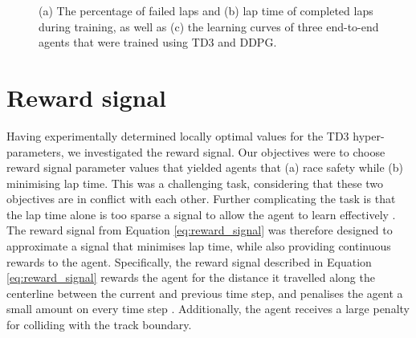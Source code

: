 \begin{figure}[htb!]
    \centering
    
    \caption[Learning curves showing for agents trained using TD3 and DDPG]{(a) The percentage of failed laps and (b) lap time of completed laps during training, as well as (c) the learning curves of three end-to-end agents that were trained using TD3 and DDPG.}
    \label{fig:learning_method}
\end{figure}








\section{Reward signal}

Having experimentally determined locally optimal values for the TD3 hyper-parameters, we investigated the reward signal.
Our objectives were to choose reward signal parameter values that yielded agents that (a) race safety while (b) minimising lap time.
This was a challenging task, considering that these two objectives are in conflict with each other.
Further complicating the task is that the lap time alone is too sparse a signal to allow the agent to learn effectively \cite{Jaritz2018, Perot2017}.
The reward signal from Equation \ref{eq:reward_signal} was therefore designed to approximate a signal that minimises lap time, while also providing continuous rewards to the agent.
Specifically, the reward signal described in Equation \ref{eq:reward_signal} rewards the agent for the distance it travelled along the centerline between the current and previous time step, and penalises the agent a small amount on every time step \cite{Fuchs2021}. 
Additionally, the agent receives a large penalty for colliding with the track boundary. 

